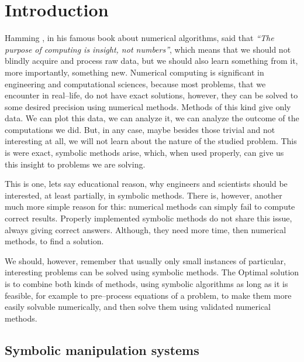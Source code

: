 
\chapter{Introduction}\label{thesis-introduction}

Hamming \cite{Hamming1987numerical}, in his famous book about numerical algorithms, said that
\emph{``The purpose of computing is insight, not numbers''}, which means that we should not blindly
acquire and process raw data, but we should also learn something from it, more importantly,
something new. Numerical computing is significant in engineering and computational sciences,
because most problems, that we encounter in real--life, do not have exact solutions, however,
they can be solved to some desired precision using numerical methods. Methods of this kind
give only data. We can plot this data, we can analyze it, we can analyze the outcome of the
computations we did. But, in any case, maybe besides those trivial and not interesting at all,
we will not learn about the nature of the studied problem. This is were exact, symbolic methods
arise, which, when used properly, can give us this insight to problems we are solving.

This is one, lets say educational reason, why engineers and scientists should be interested,
at least partially, in symbolic methods. There is, however, another much more simple reason
for this: numerical methods can simply fail to compute correct results. Properly implemented
symbolic methods do not share this issue, always giving correct answers. Although, they need
more time, then numerical methods, to find a solution.

We should, however, remember that usually only small instances of particular, interesting
problems can be solved using symbolic methods. The Optimal solution is to combine both kinds
of methods, using symbolic algorithms as long as it is feasible, for example to pre--process
equations of a problem, to make them more easily solvable numerically, and then solve them
using validated numerical methods.


\section{Symbolic manipulation systems}

